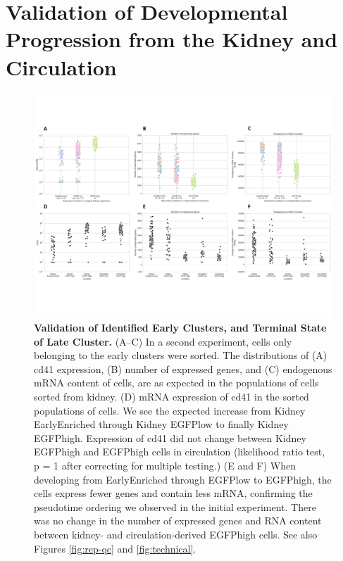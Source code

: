 \section{Validation of Developmental Progression from the Kidney and Circulation}

\begin{figure}
    \centering
    \includegraphics[width=\textwidth]{"Figure5"}
    \caption[Validation of Identified Early Clusters, and Terminal State of Late Cluster]{\textbf{Validation of Identified Early Clusters, and Terminal State of Late Cluster.} (A–C) In a second experiment, cells only belonging to the early clusters were sorted. The distributions of (A) cd41 expression, (B) number of expressed genes, and (C) endogenous mRNA content of cells, are as expected in the populations of cells sorted from kidney. (D) mRNA expression of cd41 in the sorted populations of cells. We see the expected increase from Kidney EarlyEnriched through Kidney EGFPlow to finally Kidney EGFPhigh. Expression of cd41 did not change between Kidney EGFPhigh and EGFPhigh cells in circulation (likelihood ratio test, p = 1 after correcting for multiple testing.) (E and F) When developing from EarlyEnriched through EGFPlow to EGFPhigh, the cells express fewer genes and contain less mRNA, confirming the pseudotime ordering we observed in the initial experiment. There was no change in the number of expressed genes and RNA content between kidney- and circulation-derived EGFPhigh cells. See also Figures \ref{fig:rep-qc} and \ref{fig:technical}.}
    \label{fig:replicate}
\end{figure}

